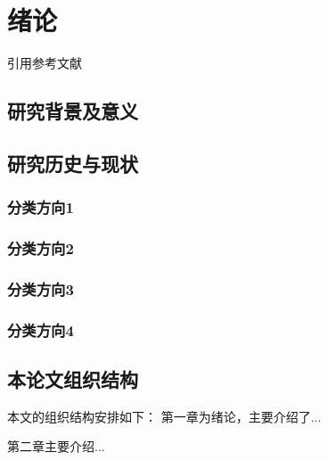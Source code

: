 \chapter{绪论}
引用参考文献~\cite{pipl2021}

\section{研究背景及意义}

\section{研究历史与现状}

\subsection{分类方向1}

\subsection{分类方向2}

\subsection{分类方向3}

\subsection{分类方向4}

\section{本论文组织结构}
本文的组织结构安排如下：
第一章为绪论，主要介绍了...

第二章主要介绍...
